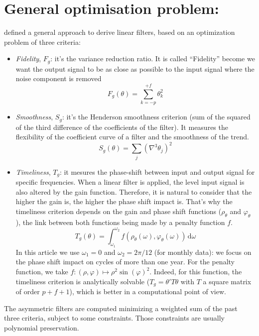 \documentclass[
  12pt,
  ,
  a4paper]{article}
\newcommand\1{\mathds{1}}
\newcommand\ud{\,\mathrm{d}}
\begin{document}
\hypertarget{sec:GuguemosEtAl}{%
\section{\texorpdfstring{General optimisation problem: \textcite{ch15HBSA}}{General optimisation problem: @ch15HBSA}}\label{sec:GuguemosEtAl}}

\textcite{ch15HBSA} defined a general approach to derive linear filters, based on an optimization problem of three criteria:

\begin{itemize}
\item
  \emph{Fidelity}, \(F_g\): it's the variance reduction ratio. It is called ``Fidelity'' become we want the output signal to be as close as possible to the input signal where the noise component is removed
  \[
  F_g(\theta) = \sum_{k=-p}^{+f}\theta_{k}^{2}
  \]
\item
  \emph{Smoothness}, \(S_g\): it's the Henderson smoothness criterion (sum of the squared of the third difference of the coefficients of the filter).
  It measures the flexibility of the coefficient curve of a filter and the smoothness of the trend.
  \[
  S_g(\theta) = \sum_{j}(\nabla^{3}\theta_{j})^{2}
  \]
\item
  \emph{Timeliness}, \(T_g\): it mesures the phase-shift between input and output signal for specific frequencies.
  When a linear filter is applied, the level input signal is also altered by the gain function.
  Therefore, it is natural to consider that the higher the gain is, the higher the phase shift impact is.
  That's why the timeliness criterion depends on the gain and phase shift functions (\(\rho_\theta\) and \(\varphi_{\theta}\)), the link between both functions being made by a penalty function \(f\).
  \[
  T_g(\theta)=\int_{\omega_{1}}^{\omega_{2}}f(\rho_{\theta}(\omega),\varphi_{\theta}(\omega))\ud\omega
  \]
  In this article we use \(\omega_1=0\) and \(\omega_2=2\pi/12\) (for monthly data): we focus on the phase shift impact on cycles of more than one year.
  For the penalty function, we take \(f\colon(\rho,\varphi)\mapsto\rho^2\sin(\varphi)^2\).
  Indeed, for this function, the timeliness criterion is analytically solvable (\(T_g=\theta'T\theta\) with \(T\) a square matrix of order \(p+f+1\)), which is better in a computational point of view.
\end{itemize}

The asymmetric filters are computed minimizing a weighted sum of the past three criteria, subject to some constraints. Those constraints are usually polynomial preservation.
\end{document}
